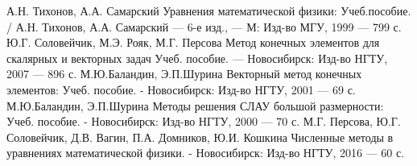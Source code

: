 \documentclass[14pt,a4paper]{extreport}
\begin{document}
%
%


%

\newpage

\tableofcontents
\newpage

\setcounter{page}{3}
%
%


%
%

\newpage

\renewcommand\bibname{СПИСОК ИСПОЛЬЗУЕМЫХ ИСТОЧНИКОВ}

\begin{thebibliography}{00}
    		А.Н. Тихонов, А.А. Самарский Уравнения математической физики: Учеб.пособие. / А.Н. Тихонов, А.А. Самарский — 6-е изд., — М: Изд-во МГУ, 1999 — 799 с.
			Ю.Г. Соловейчик, М.Э. Рояк, М.Г. Персова Метод конечных элементов для скалярных и векторных задач Учеб. пособие. — Новосибирск: Изд-во НГТУ, 2007 — 896 с.
			М.Ю.Баландин, Э.П.Шурина Векторный метод конечных элементов: Учеб. пособие. - Новосибирск: Изд-во НГТУ, 2001 — 69 с.
  			М.Ю.Баландин, Э.П.Шурина Методы решения СЛАУ большой размерности: Учеб. пособие. - Новосибирск: Изд-во НГТУ, 2000 — 70 с.
    		М.Г. Персова, Ю.Г. Соловейчик, Д.В. Вагин, П.А. Домников, Ю.И. Кошкина Численные методы в уравнениях математической физики.  - Новосибирск: Изд-во НГТУ, 2016 — 60 с.
\end{thebibliography}

\newpage
%
%

\end{document}
